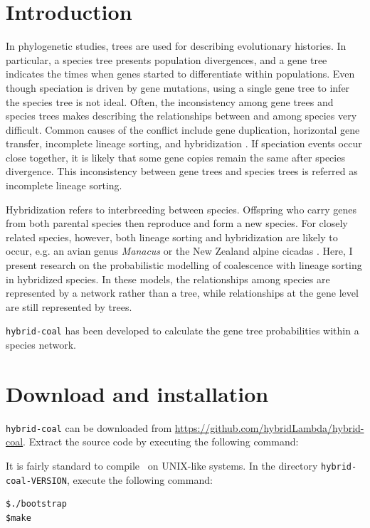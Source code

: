 

\section{Introduction}

In phylogenetic studies, trees are used for describing evolutionary histories. In particular, a species tree presents population divergences, and a gene tree indicates the times when genes started to differentiate within populations. Even though speciation is driven by gene mutations, using a single gene tree to infer the species tree is
not ideal. Often, the inconsistency among gene trees and species trees makes describing the relationships between and among species very difficult. Common causes of the conflict include gene duplication, horizontal gene transfer, incomplete lineage sorting, and hybridization \citep{Holland2008,Meng2009}. If speciation events occur close together, it is likely that some gene copies remain the same after species divergence. This inconsistency between gene trees and species trees is referred as incomplete lineage sorting.

Hybridization refers to interbreeding between species. Offspring who carry genes from both parental species then reproduce and form a new species.
For closely related species, however, both lineage sorting and hybridization are likely to occur, e.g. an avian genus {\it Manacus} \citep{Brumfield2010} or the New Zealand alpine cicadas \citep{Buckley2006}. Here, I present research on the probabilistic modelling of coalescence with lineage sorting in hybridized species. In these models, the relationships among species are represented by a network rather than a tree, while relationships at the gene level are still represented by trees.

{\tt hybrid-coal} has been developed to calculate the gene tree probabilities within a species network.

\section{Download and installation}
{\tt hybrid-coal} can be downloaded from \url{https://github.com/hybridLambda/hybrid-coal}. Extract the source code by executing the following command:

It is fairly standard to compile \hs~on UNIX-like systems. In the directory {\tt hybrid-coal-VERSION}, execute the following command:
\begin{verbatim}
$./bootstrap
$make
\end{verbatim}


